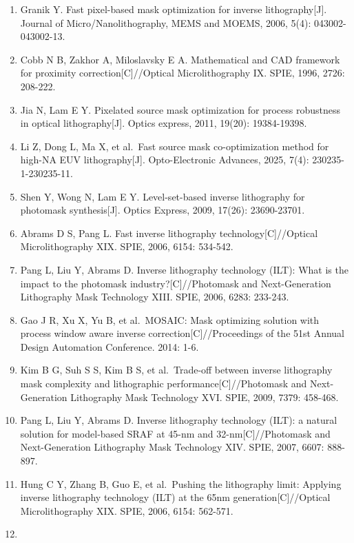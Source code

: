 \documentclass[
  preprint]{elsarticle}
\providecommand{\tightlist}{%
  \setlength{\itemsep}{0pt}\setlength{\parskip}{0pt}}
\begin{document}
\begin{enumerate}
\def\labelenumi{\arabic{enumi}.}
\tightlist
\item
  Granik Y. Fast pixel-based mask optimization for inverse
  lithography{[}J{]}. Journal of Micro/Nanolithography, MEMS and MOEMS,
  2006, 5(4): 043002-043002-13.
\item
  Cobb N B, Zakhor A, Miloslavsky E A. Mathematical and CAD framework
  for proximity correction{[}C{]}//Optical Microlithography IX. SPIE,
  1996, 2726: 208-222.
\item
  Jia N, Lam E Y. Pixelated source mask optimization for process
  robustness in optical lithography{[}J{]}. Optics express, 2011,
  19(20): 19384-19398.
\item
  Li Z, Dong L, Ma X, et al.~Fast source mask co-optimization method for
  high-NA EUV lithography{[}J{]}. Opto-Electronic Advances, 2025, 7(4):
  230235-1-230235-11.
\item
  Shen Y, Wong N, Lam E Y. Level-set-based inverse lithography for
  photomask synthesis{[}J{]}. Optics Express, 2009, 17(26): 23690-23701.
\item
  Abrams D S, Pang L. Fast inverse lithography
  technology{[}C{]}//Optical Microlithography XIX. SPIE, 2006, 6154:
  534-542.
\item
  Pang L, Liu Y, Abrams D. Inverse lithography technology (ILT): What is
  the impact to the photomask industry?{[}C{]}//Photomask and
  Next-Generation Lithography Mask Technology XIII. SPIE, 2006, 6283:
  233-243.
\item
  Gao J R, Xu X, Yu B, et al.~MOSAIC: Mask optimizing solution with
  process window aware inverse correction{[}C{]}//Proceedings of the
  51st Annual Design Automation Conference. 2014: 1-6.
\item
  Kim B G, Suh S S, Kim B S, et al.~Trade-off between inverse
  lithography mask complexity and lithographic
  performance{[}C{]}//Photomask and Next-Generation Lithography Mask
  Technology XVI. SPIE, 2009, 7379: 458-468.
\item
  Pang L, Liu Y, Abrams D. Inverse lithography technology (ILT): a
  natural solution for model-based SRAF at 45-nm and
  32-nm{[}C{]}//Photomask and Next-Generation Lithography Mask
  Technology XIV. SPIE, 2007, 6607: 888-897.
\item
  Hung C Y, Zhang B, Guo E, et al.~Pushing the lithography limit:
  Applying inverse lithography technology (ILT) at the 65nm
  generation{[}C{]}//Optical Microlithography XIX. SPIE, 2006, 6154:
  562-571.
\item

\end{enumerate}
\end{document}
